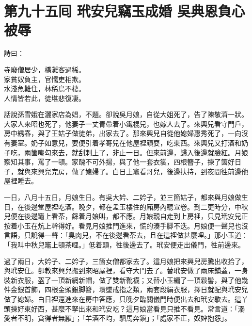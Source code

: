 
\chapter*{第九十五囘 玳安兒竊玉成婚 吳典恩負心被辱}


詩曰：

\begin{myquote}
寺廢僧居少，橋灘客過稀。\\家貧奴負主，官懦吏相欺。\\水淺魚難住，林稀鳥不棲。\\人情皆若此，徒堪悲復凄。
\end{myquote}

話說孫雪娥在灑家店為娼，不題。卻說吳月娘，自從大姐死了，告了陳敬濟一狀。大家人來昭也死了，他妻子一丈青帶着小鐵棍兒，也嫁人去了。來興兒看守門戶，房中綉春，與了王姑子做徒弟，出家去了。{}那來興兒自從他媳婦惠秀死了，一向沒有妻室。奶子如意兒，要便引着孝哥兒在他屋裡頑耍，吃東西。來興兒又打酒和奶子吃，兩箇嘲勾來去，就刮剌上了，非止一日。但來前邊，歸入後邊就臉紅。月娘察知其事，罵了一頓。家醜不可外揚，與了他一套衣裳，四根簪子，揀了箇好日子，就與來興兒完房，做了媳婦了。白日上竈看哥兒，後邊扶持，到夜間徃前邊他屋裡睡去。

一日，八月十五日，月娘生日。有吳大妗、二妗子，並三箇姑子，都來與月娘做生日，在後邊堂屋裡吃酒。晚夕，都在孟玉樓住的廂房內聽宣卷。到二更時分，中秋兒便在後邊竈上看茶，繇着月娘叫，都不應。月娘親自走到上房裡，只見玳安兒正按着小玉在炕上幹得好。看見月娘推門進來，慌的湊手脚不迭。月娘便一聲兒也沒言語，{}只說得一聲：「臭肉兒，不在後邊看茶去，且在這裡做甚麼哩。」那小玉道：「我叫中秋兒竈上頓茶哩。」低着頭，徃後邊去了。玳安便走出儀門，徃前邊來。

過了兩日，大妗子、二妗子，三箇女僧都家去了。這月娘把來興兒房騰出收拾了，與玳安住。卻教來興兒搬到來昭屋裡，看守大門去了。替玳安做了兩床鋪蓋，一身裝新衣服，盔了一頂新網新帽，做了雙新靴襪；又替小玉編了一頂鬏髻，與了他幾件金銀首飾，四根金頭銀脚簪，環墜戒指之類，兩套段絹衣服，擇日就配與玳安兒做了媳婦。{}白日裡還進來在房中答應，只晚夕臨關儀門時便出去和玳安歇去。這丫頭揀好東好西，甚麼不拏出來和玳安吃？這月娘當看見只推不看見。常言道：「溺愛者不明，貪得者無厭」；「羊酒不均，駟馬奔鎭」；「處家不正，奴婢抱怨」。

